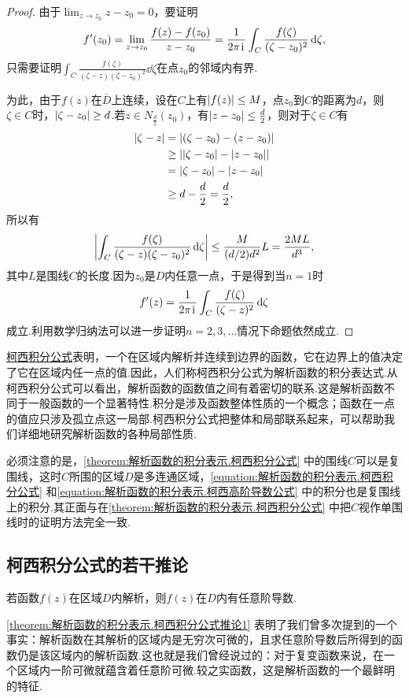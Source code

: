 \begin{theorem}
\begin{proof}
由于\(\lim_{z \to z_0} z-z_0 = 0\)，要证明\[
f'(z_0) = \lim_{z \to z_0} \frac{f(z)-f(z_0)}{z-z_0}
= \frac{1}{2\pi\kern1pt\mathrm{i}\kern1pt} \int_C{\frac{f(\zeta)}{(\zeta-z_0)^2}\dd{\zeta}},
\]只需要证明\(\int_C{\frac{f(\zeta)}{(\zeta-z)(\zeta-z_0)^2}\dd{\zeta}}\)在点\(z_0\)的邻域内有界.

为此，由于\(f(z)\)在\(\overline{D}\)上连续，设在\(C\)上有\(\abs{f(z)} \leq M\)，点\(z_0\)到\(C\)的距离为\(d\)，则\(\zeta \in C\)时，\(\abs{\zeta-z_0} \geq d\).若\(z \in N_{\frac{d}{2}}(z_0)\)，有\(\abs{z-z_0} \leq \frac{d}{2}\)，则对于\(\zeta \in C\)有\begin{align*}
\abs{\zeta-z}
&= \abs{(\zeta-z_0)-(z-z_0)} \\
&\geq \abs{ \abs{\zeta-z_0} - \abs{z-z_0} } \\
&= \abs{\zeta-z_0} - \abs{z-z_0} \\
&\geq d - \frac{d}{2} = \frac{d}{2},
\end{align*}
所以有\[
\abs{
 \int_C{\frac{f(\zeta)}{(\zeta-z)(\zeta-z_0)^2}\dd{\zeta}}
 } \leq \frac{M}{(d/2) d^2} L
= \frac{2ML}{d^3},
\]其中\(L\)是围线\(C\)的长度.因为\(z_0\)是\(D\)内任意一点，于是得到当\(n=1\)时\[
f'(z) = \frac{1}{2\pi\kern1pt\mathrm{i}\kern1pt} \int_C{\frac{f(\zeta)}{(\zeta-z)^2}\dd{\zeta}}
\]成立.利用数学归纳法可以进一步证明\(n=2,3,\dots\)情况下命题依然成立.
\end{proof}
\end{theorem}

\hyperref[equation:解析函数的积分表示.柯西积分公式]{柯西积分公式}表明，一个在区域内解析并连续到边界的函数，它在边界上的值决定了它在区域内任一点的值.因此，人们称柯西积分公式为解析函数的积分表达式.从柯西积分公式可以看出，解析函数的函数值之间有着密切的联系.这是解析函数不同于一般函数的一个显著特性.积分是涉及函数整体性质的一个概念；函数在一点的值应只涉及孤立点这一局部.柯西积分公式把整体和局部联系起来，可以帮助我们详细地研究解析函数的各种局部性质.

必须注意的是，\cref{theorem:解析函数的积分表示.柯西积分公式} 中的围线\(C\)可以是复围线，这时\(C\)所围的区域\(D\)是多连通区域，\cref{equation:解析函数的积分表示.柯西积分公式} 和\cref{equation:解析函数的积分表示.柯西高阶导数公式} 中的积分也是复围线上的积分.其正面与在\cref{theorem:解析函数的积分表示.柯西积分公式} 中把\(C\)视作单围线时的证明方法完全一致.

\subsection{柯西积分公式的若干推论}
\begin{corollary}\label{theorem:解析函数的积分表示.柯西积分公式推论1}
若函数\(f(z)\)在区域\(D\)内解析，则\(f(z)\)在\(D\)内有任意阶导数.
\end{corollary}
\cref{theorem:解析函数的积分表示.柯西积分公式推论1} 表明了我们曾多次提到的一个事实：解析函数在其解析的区域内是无穷次可微的，且求任意阶导数后所得到的函数仍是该区域内的解析函数.这也就是我们曾经说过的：对于复变函数来说，在一个区域内一阶可微就蕴含着任意阶可微.较之实函数，这是解析函数的一个最鲜明的特征.

